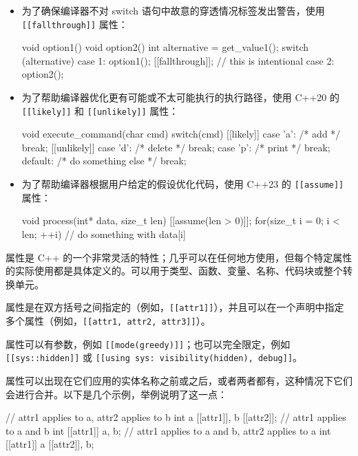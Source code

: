 \begin{itemize}
\item
为了确保编译器不对 switch 语句中故意的穿透情况标签发出警告，使用 \verb|[[fallthrough]]| 属性：

\begin{cpp}
void option1() {}
void option2() {}
int alternative = get_value1();
switch (alternative)
{
    case 1:
    option1();
    [[fallthrough]]; // this is intentional
    case 2:
    option2();
}
\end{cpp}

\item
为了帮助编译器优化更有可能或不太可能执行的执行路径，使用 C++20 的 \verb|[[likely]]| 和 \verb|[[unlikely]]| 属性：

\begin{cpp}
void execute_command(char cmd)
{
    switch(cmd)
    {
        [[likely]]
        case 'a': /* add */ break;
        [[unlikely]]
        case 'd': /* delete */ break;
        case 'p': /* print */ break;
        default:  /* do something else */ break;
    }
}
\end{cpp}

\item
为了帮助编译器根据用户给定的假设优化代码，使用 C++23 的 \verb|[[assume]]| 属性：

\begin{cpp}
void process(int* data, size_t len)
{
    [[assume(len > 0)]];
    for(size_t i = 0; i < len; ++i)
    {
        // do something with data[i]
    }
}
\end{cpp}
\end{itemize}


属性是 C++ 的一个非常灵活的特性；几乎可以在任何地方使用，但每个特定属性的实际使用都是具体定义的。可以用于类型、函数、变量、名称、代码块或整个转换单元。

属性是在双方括号之间指定的（例如，\verb|[[attr1]]|），并且可以在一个声明中指定多个属性（例如，\verb|[[attr1, attr2, attr3]]|）。

属性可以有参数，例如 \verb|[[mode(greedy)]]|；也可以完全限定，例如 \verb|[[sys::hidden]]| 或 \verb|[[using sys: visibility(hidden), debug]]|。

属性可以出现在它们应用的实体名称之前或之后，或者两者都有，这种情况下它们会进行合并。以下是几个示例，举例说明了这一点：

\begin{cpp}
// attr1 applies to a, attr2 applies to b
int a [[attr1]], b [[attr2]];
// attr1 applies to a and b
int [[attr1]] a, b;
// attr1 applies to a and b, attr2 applies to a
int [[attr1]] a [[attr2]], b;
\end{cpp}

